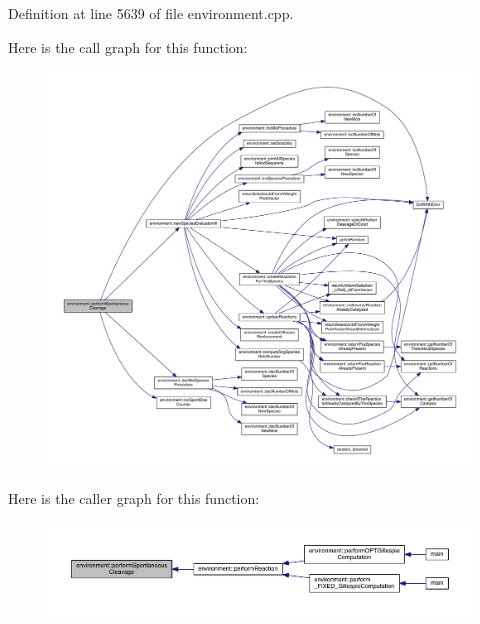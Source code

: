 Definition at line 5639 of file environment.\-cpp.



Here is the call graph for this function\-:
\nopagebreak
\begin{figure}[H]
\begin{center}
\leavevmode
\includegraphics[width=350pt]{a00014_a4949138a3771b7f6ec2bfe82cbad947e_cgraph}
\end{center}
\end{figure}




Here is the caller graph for this function\-:
\nopagebreak
\begin{figure}[H]
\begin{center}
\leavevmode
\includegraphics[width=350pt]{a00014_a4949138a3771b7f6ec2bfe82cbad947e_icgraph}
\end{center}
\end{figure}


